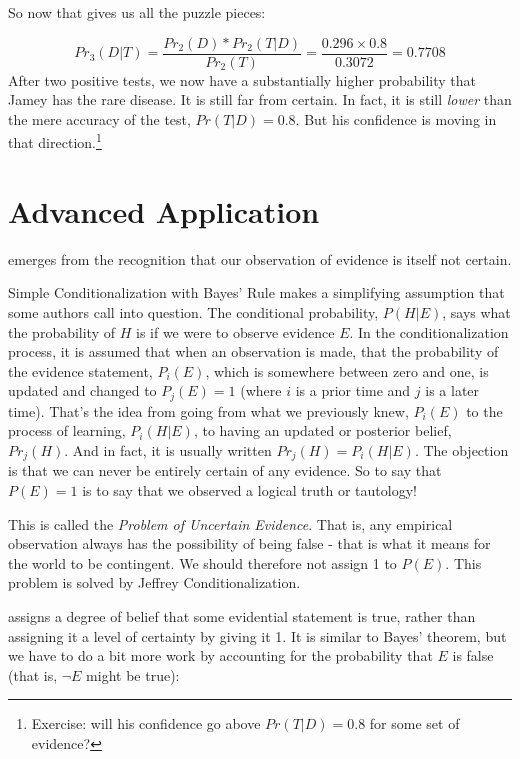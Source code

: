 \documentclass[]{tufte-book}
\begin{document}
So now that gives us all the puzzle pieces:

\[Pr_3(D|T)=\frac{Pr_2(D)*Pr_2(T|D)}{Pr_2(T)}=\frac{0.296\times 0.8}{0.3072}=0.7708\]
After two positive tests, we now have a substantially higher probability that Jamey has the rare disease. It is still far from certain. In fact, it is still \emph{lower} than the mere accuracy of the test, \(Pr(T|D)=0.8\). But his confidence is moving in that direction.\footnote{Exercise: will his confidence go above \(Pr(T|D)=0.8\) for some set of evidence?}

\hypertarget{advanced-application}{%
\section{Advanced Application}\label{advanced-application}}

 emerges from the recognition that our observation of evidence is itself not certain.

Simple Conditionalization with Bayes' Rule makes a simplifying assumption that some authors call into question. The conditional probability, \(P(H|E)\), says what the probability of \(H\) is if we were to observe evidence \(E\). In the conditionalization process, it is assumed that when an observation is made, that the probability of the evidence statement, \(P_i(E)\), which is somewhere between zero and one, is updated and changed to \(P_j(E) = 1\) (where \(i\) is a prior time and \(j\) is a later time). That's the idea from going from what we previously knew, \(P_i(E)\) to the process of learning, \(P_i(H|E)\), to having an updated or posterior belief, \(Pr_j(H)\). And in fact, it is usually written \(Pr_j(H)=P_i(H|E)\). The objection is that we can never be entirely certain of any evidence. So to say that \(P(E)=1\) is to say that we observed a logical truth or tautology!

This is called the \emph{Problem of Uncertain Evidence}. That is, any empirical observation always has the possibility of being false - that is what it means for the world to be contingent. We should therefore not assign 1 to \(P(E)\). This problem is solved by Jeffrey Conditionalization.

 assigns a degree of belief that some evidential statement is true, rather than assigning it a level of certainty by giving it 1. It is similar to Bayes' theorem, but we have to do a bit more work by accounting for the probability that \(E\) is false (that is, \(\neg E\) might be true):
\end{document}
